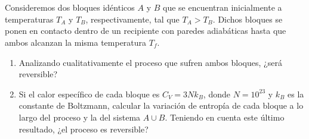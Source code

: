 \documentclass[a4paper,11pt]{article}
\begin{document}
\section{}

Consideremos dos bloques idénticos $A$ y $B$ que se encuentran 
inicialmente a temperaturas $T_A$ y $T_B$, respectivamente, tal que 
$T_A > T_B$. Dichos bloques se ponen en contacto dentro de un 
recipiente con paredes adiabáticas hasta que ambos alcanzan la misma 
temperatura $T_f$.

\begin{enumerate}[label=(\alph*),
                  leftmargin=2\parindent,
                  rightmargin=2\parindent]

    \item{Analizando cualitativamente el proceso que sufren ambos 
          bloques, ¿será reversible?}
    
    \item{Si el calor específico de cada bloque es $C_V = 3 N k_B$,
          donde $N = 10^{23}$ y $k_B$ es la constante de Boltzmann, 
          calcular la variación de entropía de cada bloque a lo largo 
          del proceso y la del sistema $A \cup B$. 
          Teniendo en cuenta este último resultado, ¿el proceso es 
          reversible?}

\end{enumerate}
\end{document}
